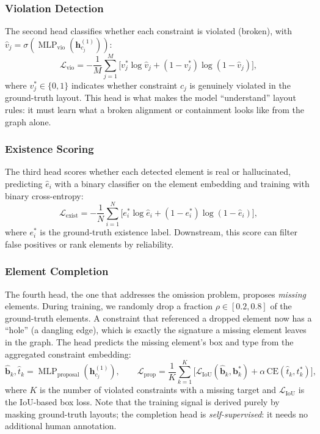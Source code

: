 \documentclass[11pt, letterpaper]{article}
\begin{document}
\subsubsection{Violation Detection}
The second head classifies whether each constraint is violated (broken), with
$\hat{v}_j=\sigma(\operatorname{MLP}_{\text{vio}}(\mathbf{h}_{c_j}^{(1)}))$:
\begin{equation}
\mathcal{L}_{\text{vio}}=-\frac{1}{M}\sum_{j=1}^{M}\bigl[
v_j^*\log\hat{v}_j+(1-v_j^*)\log(1-\hat{v}_j)\bigr],
\label{eq:lvio}
\end{equation}
where $v_j^*\in\{0,1\}$ indicates whether constraint $c_j$ is genuinely
violated in the ground-truth layout. This head is what makes the model
``understand'' layout rules: it must learn what a broken alignment or
containment looks like from the graph alone.

\subsubsection{Existence Scoring}
The third head scores whether each detected element is real or hallucinated,
predicting $\hat{e}_i$ with a binary classifier on the element embedding and
training with binary cross-entropy:
\begin{equation}
\mathcal{L}_{\text{exist}}=-\frac{1}{N}\sum_{i=1}^{N}\bigl[
e_i^*\log\hat{e}_i+(1-e_i^*)\log(1-\hat{e}_i)\bigr],
\label{eq:lexist}
\end{equation}
where $e_i^*$ is the ground-truth existence label. Downstream, this score can
filter false positives or rank elements by reliability.

\subsubsection{Element Completion}
The fourth head, the one that addresses the omission problem, proposes
\emph{missing} elements. During training, we randomly drop a fraction
$\rho\in[0.2,0.8]$ of the ground-truth elements. A constraint that referenced
a dropped element now has a ``hole'' (a dangling edge), which is exactly the
signature a missing element leaves in the graph. The head predicts the
missing element's box and type from the aggregated constraint embedding:
\begin{equation}
\hat{\mathbf{b}}_k,\hat{t}_k=
\operatorname{MLP}_{\text{proposal}}(\mathbf{h}_{c_j}^{(1)}),
\qquad
\mathcal{L}_{\text{prop}}=\frac{1}{K}\sum_{k=1}^{K}\bigl[
\mathcal{L}_{\text{IoU}}(\hat{\mathbf{b}}_k,\mathbf{b}_k^*)
+\alpha\,\mathrm{CE}(\hat{t}_k,t_k^*)\bigr],
\label{eq:lprop}
\end{equation}
where $K$ is the number of violated constraints with a missing target and
$\mathcal{L}_{\text{IoU}}$ is the IoU-based box loss. Note that the training
signal is derived purely by masking ground-truth layouts; the completion
head is \emph{self-supervised}: it needs no additional human annotation.
\end{document}

